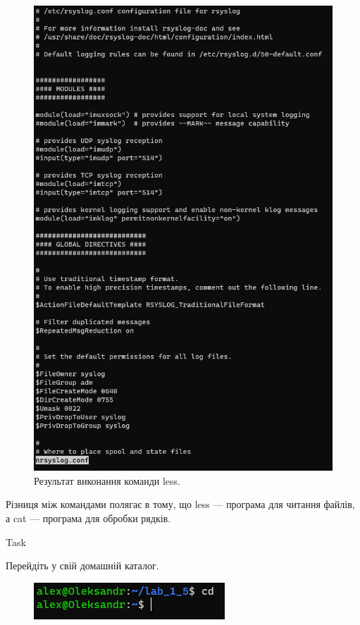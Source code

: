 \documentclass[a4paper,12pt]{article}
\newcommand{\RomanNumeralCaps}[1]{\MakeUppercase{\romannumeral #1}}
\begin{document}
\newpage
    \begin{figure}[h!]
        \begin{minipage}[h]{1\linewidth}
            \centering
            \includegraphics[width=0.6\linewidth]{Prt sc/Figure_17.png}  
        \end{minipage}
        \caption{Результат виконання команди less.}
    \end{figure}
    Різниця між командами полягає в тому, що less — програма для читання файлів, 
    а cat — програма для обробки рядків.

    \begin{center}
        \Large{Task \RomanNumeralCaps{18}}
    \end{center}
    Перейдіть у свій домашній каталог.
    \begin{figure}[h!]
        \begin{minipage}[h]{1\linewidth}
            \centering
            \includegraphics[width=0.6\linewidth]{Prt sc/Figure_18.png}  
        \end{minipage}
    \end{figure}
\end{document}

